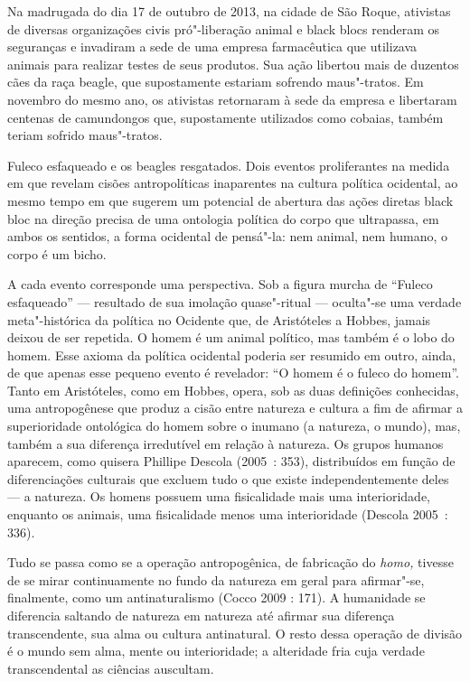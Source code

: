 Na madrugada do dia 17 de outubro de 2013, na cidade de São Roque,
ativistas de diversas organizações civis pró"-liberação animal e black
blocs renderam os seguranças e invadiram a sede de uma empresa
farmacêutica que utilizava animais para realizar testes de seus
produtos. Sua ação libertou mais de duzentos cães da raça beagle,
que supostamente estariam sofrendo maus"-tratos. Em novembro do mesmo
ano, os ativistas retornaram à sede da empresa e libertaram centenas de
camundongos que, supostamente utilizados como cobaias, também teriam
sofrido maus"-tratos.

Fuleco esfaqueado e os beagles resgatados. Dois eventos
proliferantes na medida em que revelam cisões antropolíticas inaparentes
na cultura política ocidental, ao mesmo tempo em que sugerem um
potencial de abertura das ações diretas black bloc na direção precisa de
uma ontologia política do corpo que ultrapassa, em ambos os sentidos, a
forma ocidental de pensá"-la: nem animal, nem humano, o corpo é um bicho.

A cada evento corresponde uma perspectiva. Sob a figura murcha de
``Fuleco esfaqueado'' --- resultado de sua imolação quase"-ritual ---
oculta"-se uma verdade meta"-histórica da política no Ocidente que, de
Aristóteles a Hobbes, jamais deixou de ser repetida. O homem é um animal
político, mas também é o lobo do homem. Esse axioma da política
ocidental poderia ser resumido em outro, ainda, de que apenas esse
pequeno evento é revelador: ``O homem é o fuleco do homem''. Tanto em
Aristóteles, como em Hobbes, opera, sob as duas definições conhecidas,
uma antropogênese que produz a cisão entre natureza e cultura a fim de
afirmar a superioridade ontológica do homem sobre o inumano (a natureza,
o mundo), mas, também a sua diferença irredutível em relação à natureza.
Os grupos humanos aparecem, como quisera Phillipe Descola (2005~: 353),
distribuídos em função de diferenciações culturais que excluem tudo o
que existe independentemente deles --- a natureza. Os homens possuem uma
fisicalidade mais uma interioridade, enquanto os animais, uma
fisicalidade menos uma interioridade (Descola 2005~: 336).

Tudo se passa como se a operação antropogênica, de fabricação do
\emph{homo, }tivesse de se mirar continuamente no fundo da natureza em
geral para afirmar"-se, finalmente, como um antinaturalismo (Cocco 2009 :
171). A humanidade se diferencia saltando de natureza em natureza até
afirmar sua diferença transcendente, sua alma ou cultura antinatural. O
resto dessa operação de divisão é o mundo sem alma, mente ou
interioridade; a alteridade fria cuja verdade transcendental as ciências
auscultam.

